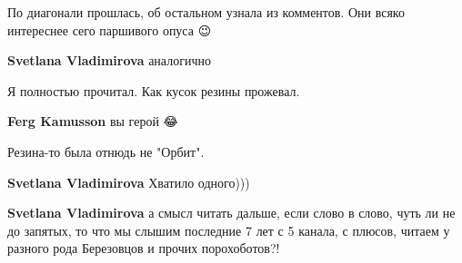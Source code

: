 \begin{itemize}
\begin{itemize}
По диагонали прошлась, об остальном узнала из комментов. Они всяко интереснее сего паршивого опуса 😉

 
\textbf{Svetlana Vladimirova} аналогично

 
Я полностью прочитал. Как кусок резины прожевал.

 
\textbf{Ferg Kamusson} вы герой 😂

 
Резина-то была отнюдь не "Орбит".

 
\textbf{Svetlana Vladimirova}
Хватило одного)))

 
\textbf{Svetlana Vladimirova} а смысл читать дальше, если слово в слово, чуть ли не до запятых, то что мы слышим последние 7 лет с 5 канала, с плюсов, читаем у разного рода Березовцов и прочих порохоботов?!


\end{itemize}
\end{itemize}
